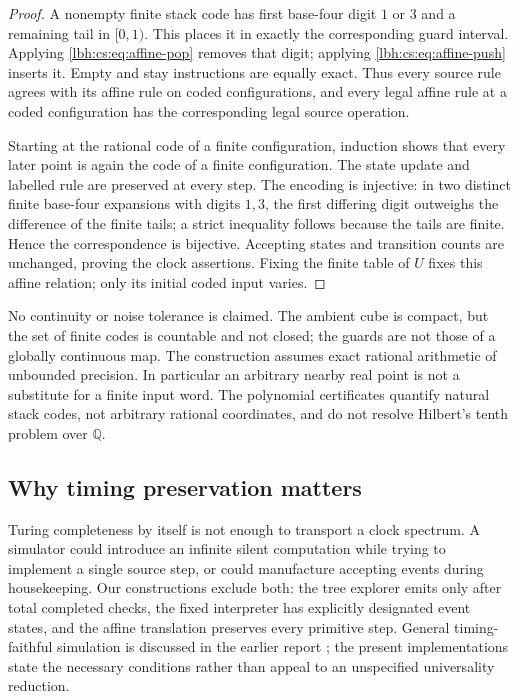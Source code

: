 \documentclass[11pt,letterpaper]{article}
\theoremstyle{definition}
\theoremstyle{remark}
\newcommand{\Q}{\mathbb Q}
\newcommand{\1}{\mathbf 1}
\newcommand{\wtag}{\textup{[write]}}%
\newcommand{\srcnote}[1]{\par\smallskip\noindent{\small\itshape #1}\par\smallskip}
\begin{document}
\begin{proof}
A nonempty finite stack code has first base-four digit $1$ or $3$ and a
remaining tail in $[0,1)$. This places it in exactly the corresponding
guard interval. Applying \eqref{lbh:cs:eq:affine-pop} removes that digit; applying
\eqref{lbh:cs:eq:affine-push} inserts it. Empty and stay instructions are equally
exact. Thus every source rule agrees with its affine rule on coded
configurations, and every legal affine rule at a coded configuration
has the corresponding legal source operation.

Starting at the rational code of a finite configuration, induction shows
that every later point is again the code of a finite configuration. The
state update and labelled rule are preserved at every step. The encoding
is injective: in two distinct finite base-four expansions with digits
$1,3$, the first differing digit outweighs the difference of the finite
tails; a strict inequality follows because the tails are finite. Hence
the correspondence is bijective. Accepting states and transition counts
are unchanged, proving the clock assertions. Fixing the finite table of
$U$ fixes this affine relation; only its initial coded input varies.
\end{proof}
\srcnote{\wtag{} [The coding \eqref{lbh:cs:eq:realcode}--\eqref{lbh:cs:eq:affine-pop} is source~10's
\eqref{lbh:eq:rational-stack}--\eqref{lbh:eq:affine-top} after the relabelling $d=1+2b$, and
\cref{lbh:cs:thm:affine} is \cref{lbh:thm:geometry}, which already transfers the c.e.\ spectra; the
new spectra transfer by the same step-exact argument. Only the control coordinate differs:
$(q+1)/(Q+2)$ here, $q/(s+1)$ in source~10.]}

No continuity or noise tolerance is claimed. The ambient cube is compact,
but the set of finite codes is countable and not closed; the guards are
not those of a globally continuous map. The construction assumes exact
rational arithmetic of unbounded precision. In particular an arbitrary
nearby real point is not a substitute for a finite input word. The
polynomial certificates quantify natural stack codes, not arbitrary
rational coordinates, and do not resolve Hilbert's tenth problem over
$\Q$.

\subsection{Why timing preservation matters}
Turing completeness by itself is not enough to transport a clock
spectrum. A simulator could introduce an infinite silent computation
while trying to implement a single source step, or could manufacture
accepting events during housekeeping. Our constructions exclude both:
the tree explorer emits only after total completed checks, the fixed
interpreter has explicitly designated event states, and the affine
translation preserves every primitive step. General timing-faithful
simulation is discussed in the earlier report \cite{cs-repo-liveness}; the
present implementations state the necessary conditions rather than
appeal to an unspecified universality reduction.
\srcnote{\wtag{} [The earlier report's discussion is \cref{lbh:sec:simulation}.]}
\end{document}
